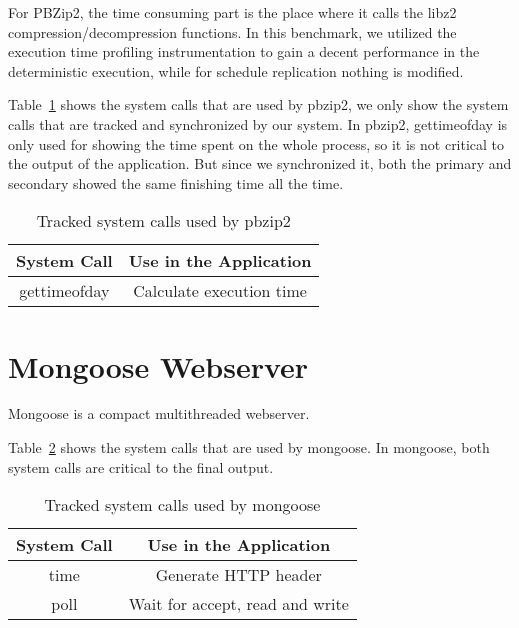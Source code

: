 

For PBZip2, the time consuming part is the place where it calls the libz2 compression/decompression functions. In this benchmark, we utilized the execution time profiling instrumentation to gain a decent performance in the deterministic execution, while for schedule replication nothing is modified.

Table~\ref{t:pbzip2_syscall} shows the system calls that are used by pbzip2, we only show the system calls that are tracked and synchronized by our system. In pbzip2,  gettimeofday is only used for showing the time spent on the whole process, so it is not critical to the output of the application. But since we synchronized it, both the primary and secondary showed the same finishing time all the time.

\begin{table}
 \caption{Tracked system calls used by pbzip2}
\begin{center}
 \begin{tabular}{c | c}
 System Call & Use in the Application\\ \hline
 gettimeofday & Calculate execution time
 \end{tabular}
\end{center}
\label{t:pbzip2_syscall}
\end{table}

\section{Mongoose Webserver}

Mongoose is a compact multithreaded webserver.

Table~\ref{t:mongoose_syscall} shows the system calls that are used by mongoose. In mongoose, both system calls are critical to the final output.

\begin{table}
\caption{Tracked system calls used by mongoose}
\begin{center}
 \begin{tabular}{c | c}
System Call & Use in the Application\\ \hline
 time & Generate HTTP header  \\ \hline
 poll & Wait for accept, read and write
 \end{tabular}
\end{center}
\label{t:mongoose_syscall}
\end{table}

